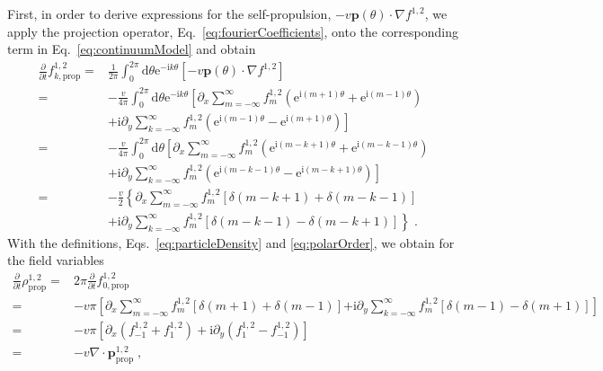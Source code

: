 \documentclass{article}
\begin{document}
First, in order to derive expressions for the self-propulsion, $-v\mathbf{p}\left( \theta \right) \cdot \nabla f^{1,2}$, we apply the projection operator, Eq.~\eqref{eq:fourierCoefficients}, onto the corresponding term in Eq.~\eqref{eq:continuumModel} and obtain
\begin{equation}
    \begin{aligned}
        \frac{\partial}{\partial t}f_{k,\mathrm{prop}}^{1,2}=&\frac{1}{2\pi}\int_0^{2\pi}{\mathrm{d}\theta \mathrm{e}^{-\mathrm{i}k\theta}\left[ -v\mathbf{p}\left( \theta \right) \cdot \nabla f^{1,2} \right]}\\
        =&-\frac{v}{4\pi}\int_0^{2\pi}{\mathrm{d}\theta \mathrm{e}^{-\mathrm{i}k\theta}\left[ \partial _x\sum_{m=-\infty}^{\infty}{f_{m}^{1,2}}\left( \mathrm{e}^{\mathrm{i}\left( m+1 \right) \theta}+\mathrm{e}^{\mathrm{i}\left( m-1 \right) \theta} \right) \right.}\\
        &\left. +\mathrm{i}\partial _y\sum_{k=-\infty}^{\infty}{f_{m}^{1,2}}\left( \mathrm{e}^{\mathrm{i}\left( m-1 \right) \theta}-\mathrm{e}^{\mathrm{i}\left( m+1 \right) \theta} \right) \right]\\
        =&-\frac{v}{4\pi}\int_0^{2\pi}{\mathrm{d}\theta \left[ \partial _x\sum_{m=-\infty}^{\infty}{f_{m}^{1,2}}\left( \mathrm{e}^{\mathrm{i}\left( m-k+1 \right) \theta}+\mathrm{e}^{\mathrm{i}\left( m-k-1 \right) \theta} \right) \right.}\\
        &\left. +\mathrm{i}\partial _y\sum_{k=-\infty}^{\infty}{f_{m}^{1,2}}\left( \mathrm{e}^{\mathrm{i}\left( m-k-1 \right) \theta}-\mathrm{e}^{\mathrm{i}\left( m-k+1 \right) \theta} \right) \right]\\
        =&-\frac{v}{2}\left\{ \partial _x\sum_{m=-\infty}^{\infty}{f_{m}^{1,2}}\left[ \delta \left( m-k+1 \right) +\delta \left( m-k-1 \right) \right] \right.\\
        &\left. +\mathrm{i}\partial _y\sum_{k=-\infty}^{\infty}{f_{m}^{1,2}}\left[ \delta \left( m-k-1 \right) -\delta \left( m-k+1 \right) \right] \right\}\;.
    \end{aligned}
\end{equation}
With the definitions, Eqs.~\eqref{eq:particleDensity} and \eqref{eq:polarOrder}, we obtain for the field variables
\begin{equation}
    \begin{aligned}
        \frac{\partial}{\partial t}\rho _{\mathrm{prop}}^{1,2}=&2\pi \frac{\partial}{\partial t}f_{0,\mathrm{prop}}^{1,2}\\
        =&-v\pi \left[ \partial _x\sum_{m=-\infty}^{\infty}{f_{m}^{1,2}}\left[ \delta \left( m+1 \right) +\delta \left( m-1 \right) \right] \right.\left. +\mathrm{i}\partial _y\sum_{k=-\infty}^{\infty}{f_{m}^{1,2}}\left[ \delta \left( m-1 \right) -\delta \left( m+1 \right) \right] \right]\\
        =&-v\pi \left[ \partial _x\left( f_{-1}^{1,2}+f_{1}^{1,2} \right) +\mathrm{i}\partial _y\left( f_{1}^{1,2}-f_{-1}^{1,2} \right) \right]\\
        =&-v\nabla \cdot \boldsymbol{p}_{\mathrm{prop}}^{1,2}\;,\\
    \end{aligned}
\end{equation}
\end{document}
